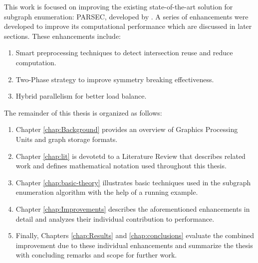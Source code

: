 This work is focused on improving the existing state-of-the-art solution for subgraph enumeration: PARSEC, developed by \cite{PARSEC_VD}.
A series of enhancements were developed to improve its computational performance which are discussed in later sections. These enhancements include:
\begin{enumerate}
    \item Smart preprocessing techniques to detect intersection reuse and reduce computation.
    \item Two-Phase strategy to improve symmetry breaking effectiveness.
    \item Hybrid parallelism for better load balance.
\end{enumerate}
The remainder of this thesis is organized as follows:
\begin{enumerate}[\indent {}]
    \item Chapter \ref{chap:Background} provides an overview of Graphics Processing Units and graph storage formats.
    \item Chapter \ref{chap:lit} is devotetd to a Literature Review that describes related work and defines mathematical notation used throughout this thesis.
    \item Chapter \ref{chap:basic-theory} illustrates basic techniques used in the subgraph enumeration algorithm with the help of a running example.
    \item Chapter \ref{chap:Improvements} describes the aforementioned enhancements in detail and analyzes their individual contribution to performance.
    \item Finally, Chapters \ref{chap:Results} and \ref{chap:conclusions} evaluate the combined improvement due to these individual enhancements and summarize the thesis with concluding remarks and scope for further work.
\end{enumerate}
